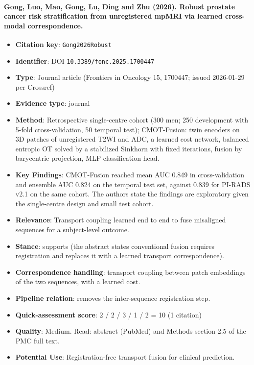\documentclass[journal,onecolumn]{IEEEtran}
\begin{document}
\paragraph{Gong, Luo, Mao, Gong, Lu, Ding and Zhu (2026). Robust prostate cancer risk stratification from unregistered mpMRI via learned cross-modal correspondence.~\cite{Gong2026Robust}}\mbox{}

\begin{itemize}

\item{} \textbf{Citation key}: \texttt{Gong2026Robust}

\item{} \textbf{Identifier}: DOI \nolinkurl{10.3389/fonc.2025.1700447}

\item{} \textbf{Type}: Journal article (Frontiers in Oncology 15, 1700447; issued 2026-01-29 per Crossref)

\item{} \textbf{Evidence type}: journal

\item{} \textbf{Method}: Retrospective single-centre cohort (300 men; 250 development with 5-fold cross-validation, 50 temporal test); CMOT-Fusion: twin encoders on 3D patches of unregistered T2WI and ADC, a learned cost network, balanced entropic OT solved by a stabilized Sinkhorn with fixed iterations, fusion by barycentric projection, MLP classification head.

\item{} \textbf{Key Findings}: CMOT-Fusion reached mean AUC 0.849 in cross-validation and ensemble AUC 0.824 on the temporal test set, against 0.839 for PI-RADS v2.1 on the same cohort. The authors state the findings are exploratory given the single-centre design and small test cohort.

\item{} \textbf{Relevance}: Transport coupling learned end to end to fuse misaligned sequences for a subject-level outcome.

\item{} \textbf{Stance}: supports (the abstract states conventional fusion requires registration and replaces it with a learned transport correspondence).

\item{} \textbf{Correspondence handling}: transport coupling between patch embeddings of the two sequences, with a learned cost.

\item{} \textbf{Pipeline relation}: removes the inter-sequence registration step.

\item{} \textbf{Quick-assessment score}: 2 / 2 / 3 / 1 / 2 = 10 (1 citation)

\item{} \textbf{Quality}: Medium. Read: abstract (PubMed) and Methods section 2.5 of the PMC full text.

\item{} \textbf{Potential Use}: Registration-free transport fusion for clinical prediction.

\end{itemize}
\end{document}
